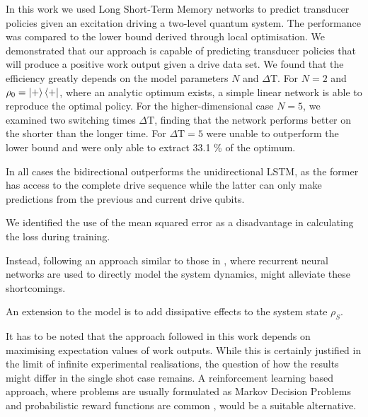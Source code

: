 In this work we used Long Short-Term Memory networks to predict transducer policies given an excitation driving a two-level quantum system.
The performance was compared to the lower bound derived through local optimisation.
We demonstrated that our approach is capable of predicting transducer policies that will produce a positive work output given a drive data set.
We found that the efficiency greatly depends on the model parameters $N$ and $\Delta \mathrm{T}$.
For $N=2$ and $\rho_0 = \ket{+}\bra{+}$, where an analytic optimum exists, a simple linear network is able to reproduce the optimal policy.
For the higher-dimensional case $N=5$, we examined two switching times $\Delta \mathrm{T}$, finding that the network performs better on the shorter than the longer time.
For $\Delta \mathrm{T} = 5$ were unable to outperform the lower bound and were only able to extract 33.1 \% of the optimum.



In all cases the bidirectional outperforms the unidirectional LSTM, as the former has access to the complete drive sequence while the latter can only make predictions from the previous and current drive qubits.


We identified the use of the mean squared error as a disadvantage in calculating the loss during training.



Instead, following an approach similar to those in \cite{Banchi_2018, PhysRevX.10.011006}, where recurrent neural networks are used to directly model the system dynamics, might alleviate these shortcomings.

An extension to the model is to add dissipative effects to the system state $\rho_S$.

It has to be noted that the approach followed in this work depends on maximising expectation values of work outputs.
While this is certainly justified in the limit of infinite experimental realisations, the question of how the results might differ in the single shot case remains.
A reinforcement learning based approach, where problems are usually formulated as Markov Decision Problems and probabilistic reward functions are common \cite{Sutton1998}, would be a suitable alternative.